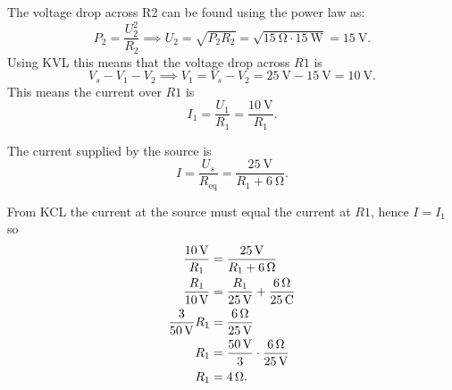 {\begin{derivation}
    The voltage drop across R2 can be found using the power law as:
    \begin{equation*}
      P_2 = \frac{U_2^2}{R_2} \implies U_2 = \sqrt{P_2R_2} = \sqrt{\qty{15}{\ohm} \cdot \qty{15}{\W}} = \qty{15}{\V} 
    .\end{equation*}
    Using KVL this means that the voltage drop across $R1$ is
    \begin{equation*}
      V_s - V_1 - V_2 \implies V_1 = V_s - V_2 = \qty{25}{\V}  - \qty{15}{\V}  = \qty{10}{\V} 
    .\end{equation*}
    This means the current over $R1$ is
    \begin{equation*}
      I_1 = \frac{U_1}{R_1} = \frac{\qty{10}{\V}}{R_1}
    .\end{equation*}

    The current supplied by the source is
    \begin{equation*}
      I = \frac{U_s}{R_{\text{eq}}} = \frac{\qty{25}{\V} }{R_1 + \qty{6}{\ohm}} 
    .\end{equation*}

    From KCL the current at the source must equal the current at $R1$, hence $I = I_1$ so
    \begin{align*}
      \frac{\qty{10}{\V}}{R_1} &= \frac{\qty{25}{\V}}{ R_1 + \qty{6}{\ohm} } \\
      \frac{R_1}{\qty{10}{\V}} &= \frac{R_1}{\qty{25}{\V} } + \frac{\qty{6}{\ohm} }{\qty{25}{\C} }\\
      \frac{3}{\qty{50}{\V} } R_1 &= \frac{\qty{6}{\ohm} }{\qty{25}{\V} } \\
      R_1 &= \frac{\qty{50}{\V} }{3} \cdot \frac{\qty{6}{\ohm} }{\qty{25}{\V} } \\
      R_1 &= \qty{4}{\ohm} 
    .\end{align*}
  \end{derivation}
}


